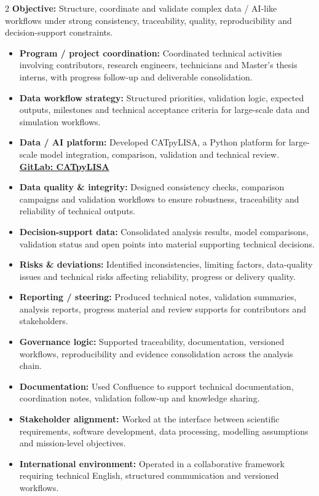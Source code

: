 \documentclass[8pt,a4paper,ragged2e,withhyper]{altacv}
\begin{document}
\begin{paracol}{2}
\textbf{Objective:} Structure, coordinate and validate complex data / AI-like workflows under strong consistency, traceability, quality, reproducibility and decision-support constraints.

\begin{itemize}
  \item \textbf{Program / project coordination:} Coordinated technical activities involving contributors, research engineers, technicians and Master's thesis interns, with progress follow-up and deliverable consolidation.
  \item \textbf{Data workflow strategy:} Structured priorities, validation logic, expected outputs, milestones and technical acceptance criteria for large-scale data and simulation workflows.
  \item \textbf{Data / AI platform:} Developed CATpyLISA, a Python platform for large-scale model integration, comparison, validation and technical review.
  \textcolor{DarkPastelRed}{\href{https://gitlab.oca.eu/gboileau/lisa_l3_tools}{\bf GitLab: CATpyLISA}}
  \item \textbf{Data quality \& integrity:} Designed consistency checks, comparison campaigns and validation workflows to ensure robustness, traceability and reliability of technical outputs.
  \item \textbf{Decision-support data:} Consolidated analysis results, model comparisons, validation status and open points into material supporting technical decisions.
  \item \textbf{Risks \& deviations:} Identified inconsistencies, limiting factors, data-quality issues and technical risks affecting reliability, progress or delivery quality.
  \item \textbf{Reporting / steering:} Produced technical notes, validation summaries, analysis reports, progress material and review supports for contributors and stakeholders.
  \item \textbf{Governance logic:} Supported traceability, documentation, versioned workflows, reproducibility and evidence consolidation across the analysis chain.
  \item \textbf{Documentation:} Used Confluence to support technical documentation, coordination notes, validation follow-up and knowledge sharing.
  \item \textbf{Stakeholder alignment:} Worked at the interface between scientific requirements, software development, data processing, modelling assumptions and mission-level objectives.
  \item \textbf{International environment:} Operated in a collaborative framework requiring technical English, structured communication and versioned workflows.
\end{itemize}


\end{paracol}
\end{document}
